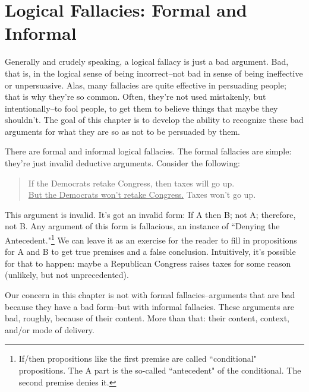 
\chapter{Logical Fallacies: Formal and Informal}
Generally and crudely speaking, a logical fallacy is just a bad argument. Bad, that is, in the logical
sense of being incorrect--not bad in sense of being ineffective or unpersuasive. Alas, many
fallacies are quite effective in persuading people; that is why they're so common. Often, they're
not used mistakenly, but intentionally--to fool people, to get them to believe things that maybe
they shouldn't. The goal of this chapter is to develop the ability to recognize these bad arguments
for what they are so as not to be persuaded by them.

There are formal and informal logical fallacies. The formal fallacies are simple: they're just invalid
deductive arguments. Consider the following:

\begin{quote}
If the Democrats retake Congress, then taxes will go up. \\
\underline{But the Democrats won't retake Congress.}
Taxes won't go up.
\end{quote}

This argument is invalid. It's got an invalid form: If A then B; not A; therefore, not B. Any
argument of this form is fallacious, an instance of ``Denying the 
Antecedent."\footnote{If/then propositions like the first premise are called ``conditional" 
propositions. The A part is the so-called
``antecedent" of the conditional. The second premise denies it.} 
We can leave it as
an exercise for the reader to fill in propositions for A and B to get true premises and a false
conclusion. Intuitively, it's possible for that to happen: maybe a Republican Congress raises taxes
for some reason (unlikely, but not unprecedented).

Our concern in this chapter is not with formal fallacies--arguments that are bad because they have
a bad form--but with informal fallacies. These arguments are bad, roughly, because of their
content. More than that: their content, context, and/or mode of delivery.


